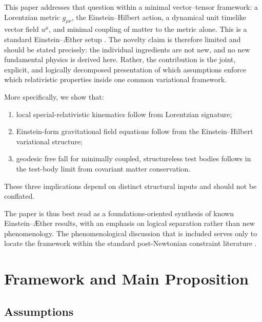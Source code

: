 \documentclass[12pt,a4paper]{article}
\newcommand{\AEther}{\AE{}ther}
\begin{document}
        This paper addresses that question within a minimal vector--tensor framework:
        a Lorentzian metric $g_{\mu\nu}$, the Einstein--Hilbert action, a dynamical
        unit timelike vector field $u^\mu$, and minimal coupling of matter to the
        metric alone. This is a standard Einstein--\AEther{} setup
        \citep{jacobson2001,jacobson2008}. The novelty claim is therefore limited and
        should be stated precisely: the individual ingredients are not new, and no new
        fundamental physics is derived here. Rather, the contribution is the joint,
        explicit, and logically decomposed presentation of which assumptions enforce
        which relativistic properties inside one common variational framework.
        
        More specifically, we show that:
        \begin{enumerate}[label=(\roman*),noitemsep]
\item local special-relativistic kinematics follow from Lorentzian signature;
\item Einstein-form gravitational field equations follow from the
Einstein--Hilbert variational structure;
\item geodesic free fall for minimally coupled, structureless test bodies
follows in the test-body limit from covariant matter conservation.
        \end{enumerate}
        These three implications depend on distinct structural inputs and should not be
        conflated.
        
        The paper is thus best read as a foundations-oriented synthesis of known
        Einstein--\AEther{} results, with an emphasis on logical separation rather than
        new phenomenology. The phenomenological discussion that is included serves only
        to locate the framework within the standard post-Newtonian constraint
        literature \citep{foster2006,will2014}.
    
    \section{Framework and Main Proposition}
        \label{sec:proposition}
        
        \subsection{Assumptions}
            
\end{document}
